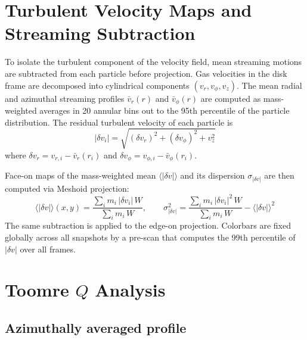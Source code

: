 \documentclass[12pt]{article}
\begin{document}

\section{Turbulent Velocity Maps and Streaming Subtraction}

To isolate the turbulent component of the velocity field, mean streaming motions
are subtracted from each particle before projection. Gas velocities in the disk
frame are decomposed into cylindrical components $(v_r, v_\phi, v_z)$. The mean
radial and azimuthal streaming profiles $\bar{v}_r(r)$ and $\bar{v}_\phi(r)$ are
computed as mass-weighted averages in 20 annular bins out to the 95th percentile
of the particle distribution. The residual turbulent velocity of each particle is
\begin{equation}
    |\delta v_i| = \sqrt{(\delta v_r)^2 + (\delta v_\phi)^2 + v_z^2}
\end{equation}
where $\delta v_r = v_{r,i} - \bar{v}_r(r_i)$ and
$\delta v_\phi = v_{\phi,i} - \bar{v}_\phi(r_i)$.

Face-on maps of the mass-weighted mean $\langle|\delta v|\rangle$ and its
dispersion $\sigma_{|\delta v|}$ are then computed via Meshoid projection:
\begin{equation}
    \langle|\delta v|\rangle(x,y)
    = \frac{\sum_i m_i\,|\delta v_i|\,W}{\sum_i m_i\,W},
    \qquad
    \sigma_{|\delta v|}^2
    = \frac{\sum_i m_i\,|\delta v_i|^2\,W}{\sum_i m_i\,W}
      - \langle|\delta v|\rangle^2
\end{equation}
The same subtraction is applied to the edge-on projection. Colorbars are fixed
globally across all snapshots by a pre-scan that computes the 99th percentile of
$|\delta v|$ over all frames.


\section{Toomre $Q$ Analysis}

\subsection*{Azimuthally averaged profile}
\end{document}
